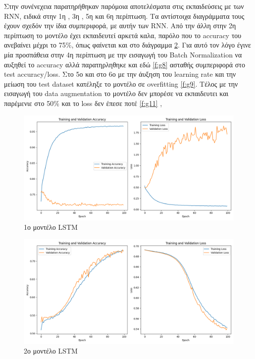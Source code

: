 Στην συνένεχεια παρατηρήθηκαν παρόμοια αποτελέσματα στις εκπαιδεύσεις με των RNN, ειδικά στην 1η , 3η , 5η και 6η περίπτωση. Τα αντίστοιχα διαγράμματα τους έχουν σχεδόν την ίδια συμπεριφορά, με αυτήν των RNN. Από την άλλη στην 2η περίπτωση το μοντέλο έχει εκπαιδευτεί αρκετά καλα, παρόλο που το accuracy του ανεβαίνει μέχρι το 75$\%$, όπως φαίνεται και στο διάγραμμα \ref{f:g6}. Για αυτό τον λόγο έγινε μία προσπάθεια στην 4η περίπτωση με την εισαγωγή του Batch Normalization να αυξηθεί το accuracy αλλά παρατηρληθηκε και εδώ \ref{f:g8} ασταθής συμπεριφορά στο test accuracy/loss. Στο 5ο και στο 6ο με την άυξηση του learning rate και την μείωση του test dataset κατέληξε το μοντέλο σε overfitting \ref{f:g9}. Τέλος με την εισαγωγή του data augmentation το μοντέλο δεν μπορέσε να εκπαιδευτει και παρέμενιε στο 50$\%$ και το loss δεν έπεσε ποτέ \ref{f:g11}
,
\begin{figure}[ht]
	\centering
	\includegraphics[width=1\linewidth]{Results/LSTM/lstm1.png}
	\caption{ 1ο μοντέλο LSTM}
	\label{f:g5}	
\end{figure}

\begin{figure}[ht]
	\centering
	\includegraphics[width=1\linewidth]{Results/LSTM/lstm2.png}
	\caption{ 2ο μοντέλο LSTM}
	\label{f:g6}	
\end{figure}

